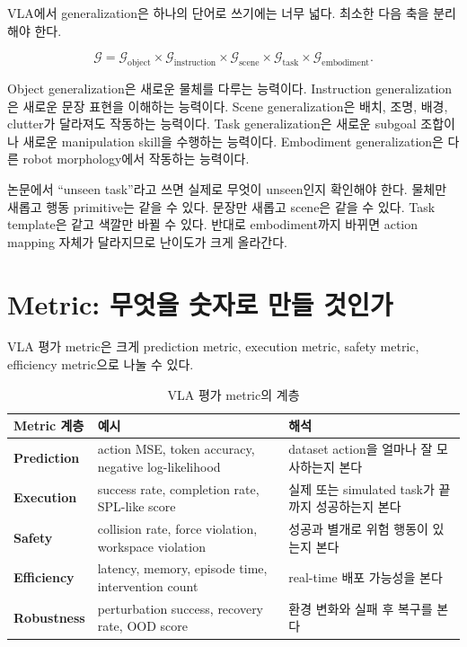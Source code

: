 VLA에서 generalization은 하나의 단어로 쓰기에는 너무 넓다. 최소한 다음 축을 분리해야 한다.

\begin{equation}
  \mathcal{G}
  =
  \mathcal{G}_{\mathrm{object}}
  \times
  \mathcal{G}_{\mathrm{instruction}}
  \times
  \mathcal{G}_{\mathrm{scene}}
  \times
  \mathcal{G}_{\mathrm{task}}
  \times
  \mathcal{G}_{\mathrm{embodiment}}.
\end{equation}

Object generalization은 새로운 물체를 다루는 능력이다. Instruction generalization은 새로운 문장 표현을 이해하는 능력이다. Scene generalization은 배치, 조명, 배경, clutter가 달라져도 작동하는 능력이다. Task generalization은 새로운 subgoal 조합이나 새로운 manipulation skill을 수행하는 능력이다. Embodiment generalization은 다른 robot morphology에서 작동하는 능력이다.

논문에서 ``unseen task''라고 쓰면 실제로 무엇이 unseen인지 확인해야 한다. 물체만 새롭고 행동 primitive는 같을 수 있다. 문장만 새롭고 scene은 같을 수 있다. Task template은 같고 색깔만 바뀔 수 있다. 반대로 embodiment까지 바뀌면 action mapping 자체가 달라지므로 난이도가 크게 올라간다.

\section{Metric: 무엇을 숫자로 만들 것인가}

VLA 평가 metric은 크게 prediction metric, execution metric, safety metric, efficiency metric으로 나눌 수 있다.

\begin{table}[t]
  \centering
  \caption{VLA 평가 metric의 계층}
  \label{tab:vla_metrics}
  \begin{tabularx}{\textwidth}{>{\bfseries}p{30mm}p{40mm}X}
    \toprule
    Metric 계층 & 예시 & 해석 \\
    \midrule
    Prediction & action MSE, token accuracy, negative log-likelihood & dataset action을 얼마나 잘 모사하는지 본다 \\
    Execution & success rate, completion rate, SPL-like score & 실제 또는 simulated task가 끝까지 성공하는지 본다 \\
    Safety & collision rate, force violation, workspace violation & 성공과 별개로 위험 행동이 있는지 본다 \\
    Efficiency & latency, memory, episode time, intervention count & real-time 배포 가능성을 본다 \\
    Robustness & perturbation success, recovery rate, OOD score & 환경 변화와 실패 후 복구를 본다 \\
    \bottomrule
  \end{tabularx}
\end{table}

